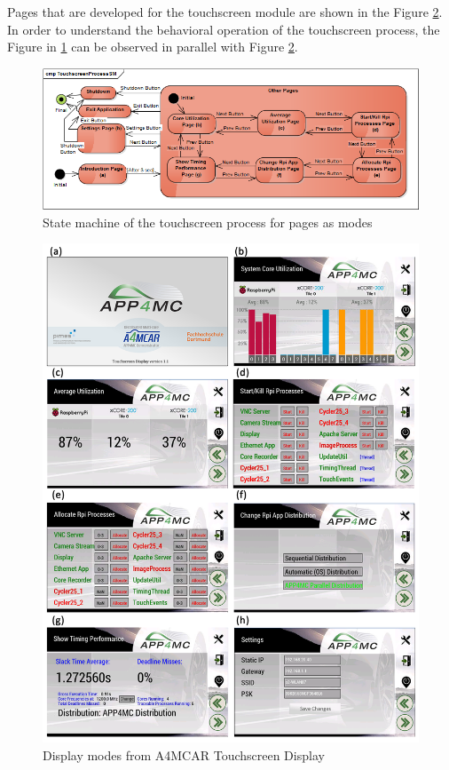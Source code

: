 Pages that are developed for the touchscreen module are shown in the Figure \ref{fig:displays}. In order to understand the behavioral operation of the touchscreen process, the Figure in \ref{fig:TouchscreenProcessSM} can be observed in parallel with Figure \ref{fig:displays}. 
\begin{figure}[!ht]
	\centering
	\captionsetup{justification=centering}
	\includegraphics[width=\textwidth]{content/images/TouchscreenProcessSM.png}
	\caption{State machine of the touchscreen process for pages as modes}
	\label{fig:TouchscreenProcessSM}
\end{figure}
\begin{figure}[!ht]
	\centering
	\captionsetup{justification=centering}
	\includegraphics[width=\textwidth]{content/images/displays.png}
	\caption{Display modes from A4MCAR Touchscreen Display}
	\label{fig:displays}
\end{figure}

